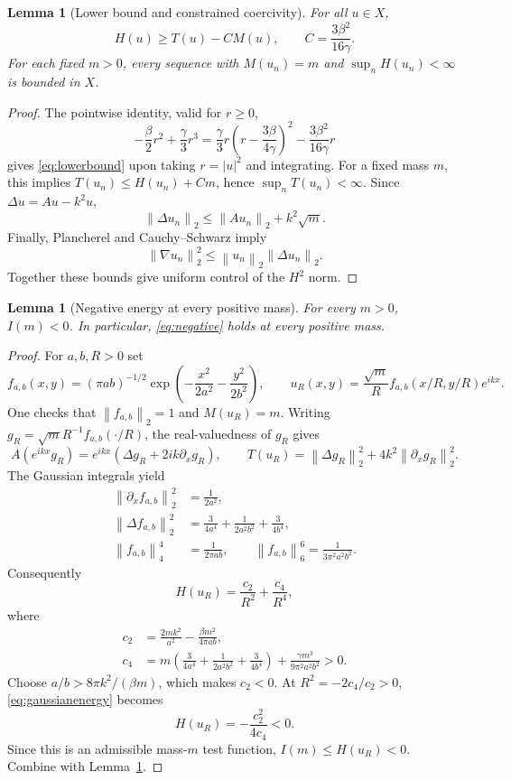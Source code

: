 \documentclass[11pt]{article}
\numberwithin{equation}{section}
\newtheorem{lemma}[theorem]{Lemma}
\theoremstyle{remark}
\newcommand{\norm}[1]{\left\lVert #1\right\rVert}
\newcommand{\abs}[1]{\left\lvert #1\right\rvert}
\begin{document}
\begin{lemma}[Lower bound and constrained coercivity]\label{lem:coercivity}
For all $u\in X$,
\begin{equation}\label{eq:lowerbound}
H(u)\ge T(u)-C M(u),\qquad C=\frac{3\beta^2}{16\gamma}.
\end{equation}
For each fixed $m>0$, every sequence with $M(u_n)=m$ and
$\sup_n H(u_n)<\infty$ is bounded in $X$.
\end{lemma}
\begin{proof}
The pointwise identity, valid for $r\ge0$,
\begin{equation}\label{eq:pointwise}
-\frac{\beta}{2}r^2+\frac{\gamma}{3}r^3
=\frac{\gamma}{3}r\left(r-\frac{3\beta}{4\gamma}\right)^2
-\frac{3\beta^2}{16\gamma}r
\end{equation}
gives \eqref{eq:lowerbound} upon taking $r=\abs{u}^2$ and integrating.
For a fixed mass $m$, this implies
$T(u_n)\le H(u_n)+Cm$, hence $\sup_n T(u_n)<\infty$.
Since $\Delta u=Au-k^2u$,
\[
\norm{\Delta u_n}_2\le\norm{Au_n}_2+k^2\sqrt m.
\]
Finally, Plancherel and Cauchy--Schwarz imply
\[
\norm{\nabla u_n}_2^2
\le\norm{u_n}_2\norm{\Delta u_n}_2.
\]
Together these bounds give uniform control of the $H^2$ norm.
\end{proof}

\begin{lemma}[Negative energy at every positive mass]\label{lem:negative}
For every $m>0$, $I(m)<0$. In particular,
\eqref{eq:negative} holds at every positive mass.
\end{lemma}
\begin{proof}
For $a,b,R>0$ set
\[
f_{a,b}(x,y)=(\pi ab)^{-1/2}
\exp\!\left(-\frac{x^2}{2a^2}-\frac{y^2}{2b^2}\right),
\qquad
u_R(x,y)=\frac{\sqrt m}{R}f_{a,b}(x/R,y/R)e^{ikx}.
\]
One checks that $\norm{f_{a,b}}_2=1$ and $M(u_R)=m$.
Writing $g_R=\sqrt m R^{-1}f_{a,b}(\cdot/R)$, the real-valuedness of $g_R$
gives
\[
A(e^{ikx}g_R)=e^{ikx}(\Delta g_R+2ik\partial_xg_R),\qquad
T(u_R)=\norm{\Delta g_R}_2^2+4k^2\norm{\partial_xg_R}_2^2.
\]
The Gaussian integrals yield
\begin{align*}
\norm{\partial_x f_{a,b}}_2^2&=\frac{1}{2a^2},\\
\norm{\Delta f_{a,b}}_2^2
&=\frac{3}{4a^4}+\frac{1}{2a^2b^2}+\frac{3}{4b^4},\\
\norm{f_{a,b}}_4^4&=\frac{1}{2\pi ab},\qquad
\norm{f_{a,b}}_6^6=\frac{1}{3\pi^2a^2b^2}.
\end{align*}
Consequently
\begin{equation}\label{eq:gaussianenergy}
H(u_R)=\frac{c_2}{R^2}+\frac{c_4}{R^4},
\end{equation}
where
\begin{align}
 c_2&=\frac{2mk^2}{a^2}-\frac{\beta m^2}{4\pi ab},
 \label{eq:c2}\\
 c_4&=m\left(\frac{3}{4a^4}+\frac{1}{2a^2b^2}
 +\frac{3}{4b^4}\right)+\frac{\gamma m^3}{9\pi^2a^2b^2}>0.
 \label{eq:c4}
\end{align}
Choose $a/b>8\pi k^2/(\beta m)$, which makes $c_2<0$.
At $R^2=-2c_4/c_2>0$, \eqref{eq:gaussianenergy} becomes
\[
H(u_R)=-\frac{c_2^2}{4c_4}<0.
\]
Since this is an admissible mass-$m$ test function, $I(m)\le H(u_R)<0$.
Combine with Lemma~\ref{lem:coercivity}.
\end{proof}
\end{document}
